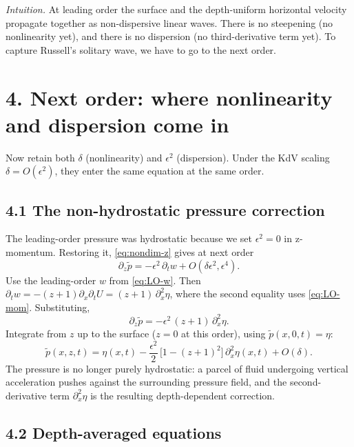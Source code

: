 \documentclass{article}
\begin{document}
\noindent\emph{Intuition.} At leading order the surface and the depth-uniform horizontal velocity propagate together as non-dispersive linear waves. There is no steepening (no nonlinearity yet), and there is no dispersion (no third-derivative term yet). To capture Russell's solitary wave, we have to go to the next order.

\section*{4. Next order: where nonlinearity and dispersion come in}

Now retain both \(\delta\) (nonlinearity) and \(\epsilon^2\) (dispersion). Under the KdV scaling \(\delta = O(\epsilon^2)\), they enter the same equation at the same order.

\subsection*{4.1 The non-hydrostatic pressure correction}

The leading-order pressure was hydrostatic because we set \(\epsilon^2 = 0\) in z-momentum. Restoring it, \eqref{eq:nondim-z} gives at next order
\begin{equation}
\partial_z \tilde p = -\epsilon^2\, \partial_t w + O(\delta \epsilon^2, \epsilon^4).
\label{eq:NLO-pz}
\end{equation}
Use the leading-order \(w\) from \eqref{eq:LO-w}. Then \(\partial_t w = -(z+1)\partial_x \partial_t U = (z+1)\, \partial_x^2 \eta\), where the second equality uses \eqref{eq:LO-mom}. Substituting,
\[
\partial_z \tilde p = -\epsilon^2\, (z+1)\, \partial_x^2 \eta.
\]
Integrate from \(z\) up to the surface (\(z = 0\) at this order), using \(\tilde p(x, 0, t) = \eta\):
\begin{equation}
\tilde p(x, z, t) = \eta(x, t) - \frac{\epsilon^2}{2}\,\bigl[1 - (z+1)^2\bigr]\, \partial_x^2 \eta(x, t) + O(\delta).
\label{eq:p-correction}
\end{equation}
The pressure is no longer purely hydrostatic: a parcel of fluid undergoing vertical acceleration pushes against the surrounding pressure field, and the second-derivative term \(\partial_x^2 \eta\) is the resulting depth-dependent correction.

\subsection*{4.2 Depth-averaged equations}
\end{document}
